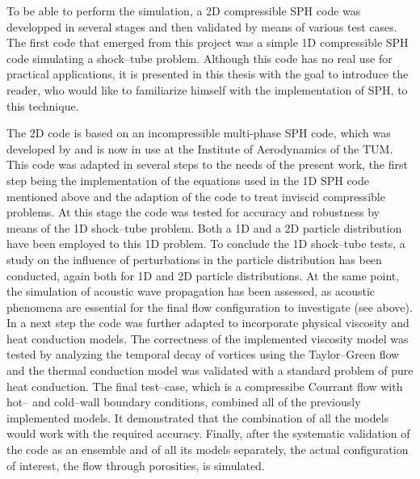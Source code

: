 \documentclass{report}
\begin{document}
To be able to perform the simulation, a 2D compressible SPH code was developped in several stages and then validated by means of various test cases.
The first code that emerged from this project was a simple 1D compressible SPH code simulating a shock--tube problem. Although this code has no real use for practical applications, it is presented in this thesis with the goal to introduce the reader, who would like to familiarize himself with the implementation of SPH, to this technique.

The 2D code is based on an incompressible multi-phase SPH code, which was developed by \cite{Hu2006} and is now in use at the Institute of Aerodynamics of the TUM. This code was adapted in several steps to the needs of the present work, the first step being the implementation of the equations used in the 1D SPH code mentioned above and the adaption of the code to treat inviscid compressible problems. At this stage the code was tested for accuracy and robustness
by means of the 1D shock--tube problem. Both a 1D and a 2D particle distribution have been employed to this 1D problem. To conclude the 1D shock--tube tests, a study on the influence of perturbations in the particle distribution has been conducted, again both for 1D and 2D particle distributions.
At the same point, the simulation of acoustic wave propagation has been assessed, as acoustic phenomena are essential for the final flow configuration to investigate (see above).
In a next step the code was further adapted to incorporate physical viscosity and heat conduction models. The correctness of the implemented viscosity model was tested by analyzing the temporal decay of vortices using the Taylor--Green flow and the thermal conduction model was validated with a standard problem of pure heat conduction.
The final test--case, which is a compressibe Courrant flow with hot-- and cold--wall boundary conditions, combined all of the previously implemented models. It demonstrated that the combination of all the models would work with the required accuracy.
Finally, after the systematic validation of the code as an ensemble and of all its models separately, the actual configuration of interest, the flow through porosities, is simulated. 
\end{document}
